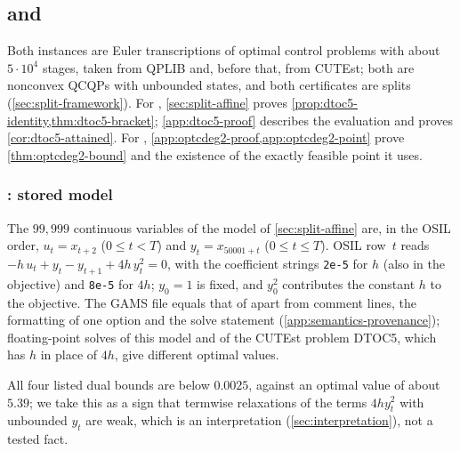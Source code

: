 \subsection{ and }\label{app:dtoc5}

Both instances are Euler transcriptions of optimal control problems with about $5\cdot10^4$ stages, taken from QPLIB and, before that, from CUTEst; both are nonconvex QCQPs with unbounded states, and both certificates are splits (\cref{sec:split-framework}).
For , \cref{sec:split-affine} proves \cref{prop:dtoc5-identity,thm:dtoc5-bracket}; \cref{app:dtoc5-proof} describes the evaluation and proves \cref{cor:dtoc5-attained}.
For , \cref{app:optcdeg2-proof,app:optcdeg2-point} prove \cref{thm:optcdeg2-bound} and the existence of the exactly feasible point it uses.

\subsubsection{: stored model}\label{app:dtoc5-model}

The $99{,}999$ continuous variables of the model of \cref{sec:split-affine} are, in the OSIL order, $u_t=x_{t+2}$ ($0\le t<T$) and $y_t=x_{50001+t}$ ($0\le t\le T$).
OSIL row~$t$ reads $-h\,u_t+y_t-y_{t+1}+4h\,y_t^2=0$, with the coefficient strings \texttt{2e-5} for $h$ (also in the objective) and \texttt{8e-5} for $4h$; $y_0=1$ is fixed, and $y_0^2$ contributes the constant $h$ to the objective.
The GAMS file equals that of  apart from comment lines, the formatting of one option and the solve statement (\cref{app:semantics-provenance}); floating-point solves of this model and of the CUTEst problem DTOC5, which has $h$ in place of $4h$, give different optimal values.

All four listed dual bounds are below $0.0025$, against an optimal value of about $5.39$; we take this as a sign that termwise relaxations of the terms $4hy_t^2$ with unbounded $y_t$ are weak, which is an interpretation (\cref{sec:interpretation}), not a tested fact.

